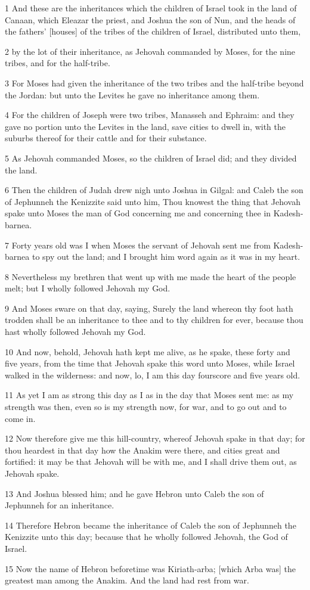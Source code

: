 \par 1 And these are the inheritances which the children of Israel took in the land of Canaan, which Eleazar the priest, and Joshua the son of Nun, and the heads of the fathers' [houses] of the tribes of the children of Israel, distributed unto them,
\par 2 by the lot of their inheritance, as Jehovah commanded by Moses, for the nine tribes, and for the half-tribe.
\par 3 For Moses had given the inheritance of the two tribes and the half-tribe beyond the Jordan: but unto the Levites he gave no inheritance among them.
\par 4 For the children of Joseph were two tribes, Manasseh and Ephraim: and they gave no portion unto the Levites in the land, save cities to dwell in, with the suburbs thereof for their cattle and for their substance.
\par 5 As Jehovah commanded Moses, so the children of Israel did; and they divided the land.
\par 6 Then the children of Judah drew nigh unto Joshua in Gilgal: and Caleb the son of Jephunneh the Kenizzite said unto him, Thou knowest the thing that Jehovah spake unto Moses the man of God concerning me and concerning thee in Kadesh-barnea.
\par 7 Forty years old was I when Moses the servant of Jehovah sent me from Kadesh-barnea to spy out the land; and I brought him word again as it was in my heart.
\par 8 Nevertheless my brethren that went up with me made the heart of the people melt; but I wholly followed Jehovah my God.
\par 9 And Moses sware on that day, saying, Surely the land whereon thy foot hath trodden shall be an inheritance to thee and to thy children for ever, because thou hast wholly followed Jehovah my God.
\par 10 And now, behold, Jehovah hath kept me alive, as he spake, these forty and five years, from the time that Jehovah spake this word unto Moses, while Israel walked in the wilderness: and now, lo, I am this day fourscore and five years old.
\par 11 As yet I am as strong this day as I as in the day that Moses sent me: as my strength was then, even so is my strength now, for war, and to go out and to come in.
\par 12 Now therefore give me this hill-country, whereof Jehovah spake in that day; for thou heardest in that day how the Anakim were there, and cities great and fortified: it may be that Jehovah will be with me, and I shall drive them out, as Jehovah spake.
\par 13 And Joshua blessed him; and he gave Hebron unto Caleb the son of Jephunneh for an inheritance.
\par 14 Therefore Hebron became the inheritance of Caleb the son of Jephunneh the Kenizzite unto this day; because that he wholly followed Jehovah, the God of Israel.
\par 15 Now the name of Hebron beforetime was Kiriath-arba; [which Arba was] the greatest man among the Anakim. And the land had rest from war.

